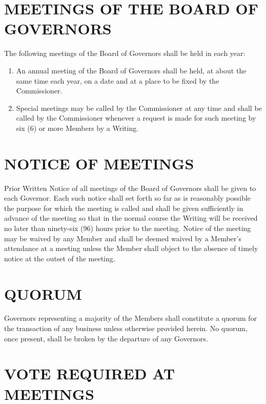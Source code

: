 \documentclass[]{book}
\providecommand{\tightlist}{%
  \setlength{\itemsep}{0pt}\setlength{\parskip}{0pt}}
\theoremstyle{definition}
\theoremstyle{definition}
\theoremstyle{definition}
\theoremstyle{remark}
\begin{document}
\section{MEETINGS OF THE BOARD OF
GOVERNORS}\label{meetings-of-the-board-of-governors}

The following meetings of the Board of Governors shall be held in each
year:

\begin{enumerate}
\def\labelenumi{(\alph{enumi})}
\tightlist
\item
  An annual meeting of the Board of Governors shall be held, at about
  the same time each year, on a date and at a place to be fixed by the
  Commissioner.
\item
  Special meetings may be called by the Commissioner at any time and
  shall be called by the Commissioner whenever a request is made for
  such meeting by six (6) or more Members by a Writing.
\end{enumerate}

\section{NOTICE OF MEETINGS}\label{notice-of-meetings}

Prior Written Notice of all meetings of the Board of Governors shall be
given to each Governor. Each such notice shall set forth so far as is
reasonably possible the purpose for which the meeting is called and
shall be given sufficiently in advance of the meeting so that in the
normal course the Writing will be received no later than ninety-six (96)
hours prior to the meeting. Notice of the meeting may be waived by any
Member and shall be deemed waived by a Member's attendance at a meeting
unless the Member shall object to the absence of timely notice at the
outset of the meeting.

\section{QUORUM}\label{quorum}

Governors representing a majority of the Members shall constitute a
quorum for the transaction of any business unless otherwise provided
herein. No quorum, once present, shall be broken by the departure of any
Governors.

\section{VOTE REQUIRED AT MEETINGS}\label{vote-required-at-meetings}
\end{document}
